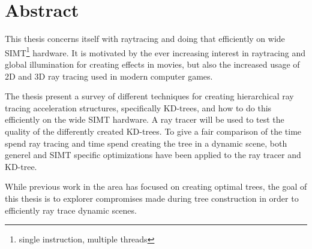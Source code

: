 

\section*{Abstract}

This thesis concerns itself with raytracing and doing that efficiently
on wide SIMT\footnote{single instruction, multiple threads}
hardware. It is motivated by the ever increasing interest in
raytracing and global illumination for creating effects in movies, but
also the increased usage of 2D and 3D ray tracing used in modern
computer games.

The thesis present a survey of different techniques for creating
hierarchical ray tracing acceleration structures, specifically
KD-trees, and how to do this efficiently on the wide SIMT hardware. A
ray tracer will be used to test the quality of the differently created
KD-trees. To give a fair comparison of the time spend ray tracing and
time spend creating the tree in a dynamic scene, both generel and SIMT
specific optimizations have been applied to the ray tracer and
KD-tree.

While previous work in the area has focused on creating optimal trees,
the goal of this thesis is to explorer compromises made during tree
construction in order to efficiently ray trace dynamic scenes.










